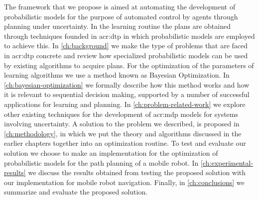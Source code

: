 The framework that we propose is aimed at automating the development of probabilistic models for the purpose of automated control by agents through planning under uncertainty.
In the learning routine the plans are obtained through techniques founded in \acrlong{acr:dtp} in which probabilistic models are employed to achieve this.
In \autoref{ch:background} we make the type of problems that are faced in \acrshort{acr:dtp} concrete and review how specialized probabilistic models can be used by existing algorithms to acquire plans.
For the optimization of the parameters of learning algorithms we use a method known as Bayesian Optimization. In \autoref{ch:bayesian-optimization} we formally describe how this method works and how it is relevant to sequential decision making, supported by a number of successful applications for learning and planning.
In \autoref{ch:problem-related-work} we explore other existing techniques for the development of \acrshort{acr:mdp} models for systems involving uncertainty.
A solution to the problem we described, is proposed in \autoref{ch:methodology}, in which we put the theory and algorithms discussed in the earlier chapters together into an optimization routine.
To test and evaluate our solution we choose to make an implementation for the optimization of probabilistic models for the path planning of a mobile robot.
In \autoref{ch:experimental-results} we discuss the results obtained from testing the proposed solution with our implementation for mobile robot navigation.
Finally, in \autoref{ch:conclusions} we summarize and evaluate the proposed solution.

%
